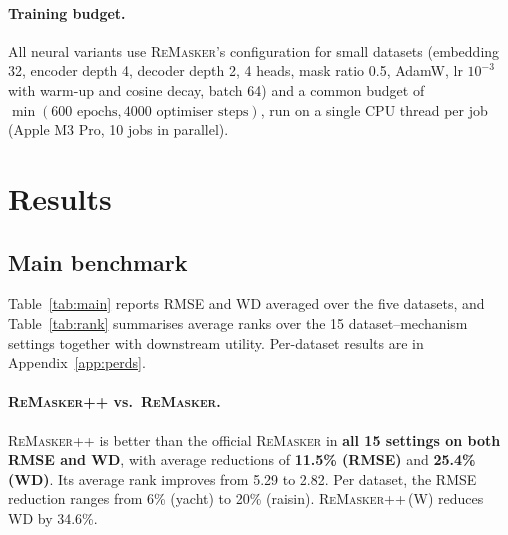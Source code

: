 \documentclass[11pt]{article}
\newcommand{\rmpp}{\textsc{ReMasker++}}
\newcommand{\remasker}{\textsc{ReMasker}}
\begin{document}
\paragraph{Training budget.} All neural variants use \remasker's configuration for small datasets (embedding 32, encoder depth 4, decoder depth 2, 4 heads, mask ratio 0.5, AdamW, lr $10^{-3}$ with warm-up and cosine decay, batch 64) and a common budget of $\min(600\text{ epochs}, 4000\text{ optimiser steps})$, run on a single CPU thread per job (Apple M3 Pro, 10 jobs in parallel).

\section{Results}
\subsection{Main benchmark}
Table~\ref{tab:main} reports RMSE and WD averaged over the five datasets, and Table~\ref{tab:rank} summarises average ranks over the 15 dataset--mechanism settings together with downstream utility. Per-dataset results are in Appendix~\ref{app:perds}.

\begin{table}[h]
\centering\small\setlength{\tabcolsep}{3.5pt}
\resizebox{\linewidth}{!}{}
\caption{Imputation fidelity at 30\% missingness (average over 5 datasets; mean $\pm$ std over 3 seeds). \textbf{Best}, \underline{second best}.}
\label{tab:main}
\end{table}

\begin{table}[h]
\centering\small
\resizebox{\linewidth}{!}{}
\caption{Left: average rank over the 15 dataset $\times$ mechanism settings (1 = best). Right: downstream score minus complete-data (oracle) score, averaged over datasets (AUROC for raisin/wine, $R^2$ for regression; closer to 0 is better).}
\label{tab:rank}
\end{table}

\paragraph{\rmpp{} vs.\ \remasker.} \rmpp{} is better than the official \remasker{} in \textbf{all 15 settings on both RMSE and WD}, with average reductions of \textbf{11.5\% (RMSE)} and \textbf{25.4\% (WD)}. Its average rank improves from 5.29 to 2.82. Per dataset, the RMSE reduction ranges from 6\% (yacht) to 20\% (raisin). \rmpp{}\,(W) reduces WD by 34.6\%.
\end{document}

